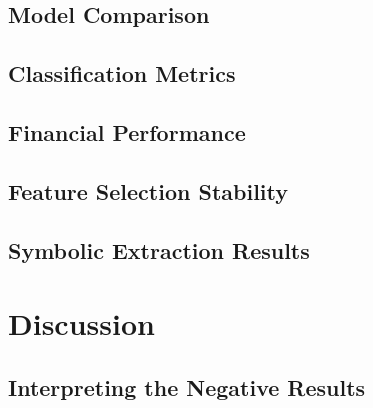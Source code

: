 \documentclass[12pt,a4paper,oneside]{article}
\begin{document}

\subsection{Model Comparison}\label{subsec:results_comparison}

\subsection{Classification Metrics}\label{subsec:results_classification}

\subsection{Financial Performance}\label{subsec:results_financial}

\subsection{Feature Selection Stability}\label{subsec:results_features}

\subsection{Symbolic Extraction Results}\label{subsec:results_symbolic}


\newpage
\section{Discussion}\label{sec:discussion}


\subsection{Interpreting the Negative Results}\label{subsec:disc_negative}
\end{document}
